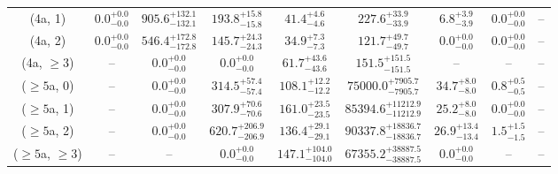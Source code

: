 \begin{table}[h!]
{\begin{tabular}{ccccccccc}
	(4a, 1) & $0.0^{+ 0.0 }_{- 0.0 }$ & $905.6^{+ 132.1 }_{- 132.1 }$ & $193.8^{+ 15.8 }_{- 15.8 }$ & $41.4^{+ 4.6 }_{- 4.6 }$ & $227.6^{+ 33.9 }_{- 33.9 }$ & $6.8^{+ 3.9 }_{- 3.9 }$ & $0.0^{+ 0.0 }_{- 0.0 }$ & -- \\[0.5ex] 
	(4a, 2) & $0.0^{+ 0.0 }_{- 0.0 }$ & $546.4^{+ 172.8 }_{- 172.8 }$ & $145.7^{+ 24.3 }_{- 24.3 }$ & $34.9^{+ 7.3 }_{- 7.3 }$ & $121.7^{+ 49.7 }_{- 49.7 }$ & $0.0^{+ 0.0 }_{- 0.0 }$ & $0.0^{+ 0.0 }_{- 0.0 }$ & -- \\[0.5ex] 
	(4a, $\ge3$) & -- & $0.0^{+ 0.0 }_{- 0.0 }$ & $0.0^{+ 0.0 }_{- 0.0 }$ & $61.7^{+ 43.6 }_{- 43.6 }$ & $151.5^{+ 151.5 }_{- 151.5 }$ & -- & -- & -- \\[0.5ex] 
	($\ge5$a, 0) & -- & $0.0^{+ 0.0 }_{- 0.0 }$ & $314.5^{+ 57.4 }_{- 57.4 }$ & $108.1^{+ 12.2 }_{- 12.2 }$ & $75000.0^{+ 7905.7 }_{- 7905.7 }$ & $34.7^{+ 8.0 }_{- 8.0 }$ & $0.8^{+ 0.5 }_{- 0.5 }$ & -- \\[0.5ex] 
	($\ge5$a, 1) & -- & $0.0^{+ 0.0 }_{- 0.0 }$ & $307.9^{+ 70.6 }_{- 70.6 }$ & $161.0^{+ 23.5 }_{- 23.5 }$ & $85394.6^{+ 11212.9 }_{- 11212.9 }$ & $25.2^{+ 8.0 }_{- 8.0 }$ & $0.0^{+ 0.0 }_{- 0.0 }$ & -- \\[0.5ex] 
	($\ge5$a, 2) & -- & $0.0^{+ 0.0 }_{- 0.0 }$ & $620.7^{+ 206.9 }_{- 206.9 }$ & $136.4^{+ 29.1 }_{- 29.1 }$ & $90337.8^{+ 18836.7 }_{- 18836.7 }$ & $26.9^{+ 13.4 }_{- 13.4 }$ & $1.5^{+ 1.5 }_{- 1.5 }$ & -- \\[0.5ex] 
	($\ge5$a, $\ge3$) & -- & -- & $0.0^{+ 0.0 }_{- 0.0 }$ & $147.1^{+ 104.0 }_{- 104.0 }$ & $67355.2^{+ 38887.5 }_{- 38887.5 }$ & $0.0^{+ 0.0 }_{- 0.0 }$ & -- & -- \\[0.5ex] 
	\hline
	\hline
\end{tabular}}
\end{table}

